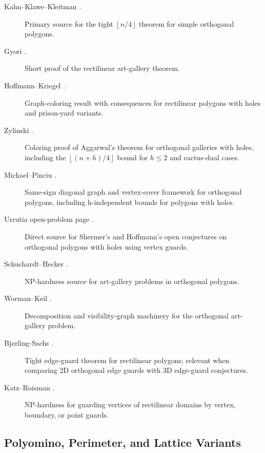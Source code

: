\documentclass[11pt]{article}
\newcommand{\floor}[1]{\left\lfloor #1 \right\rfloor}
\begin{document}
\begin{description}
  \item[Kahn--Klawe--Kleitman \cite{KahnKlaweKleitman1983}.]
  Primary source for the tight $\floor{n/4}$ theorem for simple orthogonal
  polygons.

  \item[Gyori \cite{Gyori1986}.]
  Short proof of the rectilinear art-gallery theorem.

  \item[Hoffmann--Kriegel \cite{HoffmannKriegel1996}.]
  Graph-coloring result with consequences for rectilinear polygons with holes
  and prison-yard variants.

  \item[Zylinski \cite{Zylinski2006}.]
  Coloring proof of Aggarwal's theorem for orthogonal galleries with holes,
  including the $\floor{(n+h)/4}$ bound for $h\leq 2$ and cactus-dual cases.

  \item[Michael--Pinciu \cite{MichaelPinciu2016}.]
  Same-sign diagonal graph and vertex-cover framework for orthogonal polygons,
  including h-independent bounds for polygons with holes.

  \item[Urrutia open-problem page \cite{UrrutiaOpenProblems}.]
  Direct source for Shermer's and Hoffmann's open conjectures on orthogonal
  polygons with holes using vertex guards.

  \item[Schuchardt--Hecker \cite{SchuchardtHecker1995}.]
  NP-hardness source for art-gallery problems in orthogonal polygons.

  \item[Worman--Keil \cite{WormanKeil2007}.]
  Decomposition and visibility-graph machinery for the orthogonal art-gallery
  problem.

  \item[Bj{\o}rling-Sachs \cite{BjorlingSachs1998}.]
  Tight edge-guard theorem for rectilinear polygons; relevant when comparing
  2D orthogonal edge guards with 3D edge-guard conjectures.

  \item[Katz--Roisman \cite{KatzRoisman2008}.]
  NP-hardness for guarding vertices of rectilinear domains by vertex, boundary,
  or point guards.
\end{description}

\subsection*{Polyomino, Perimeter, and Lattice Variants}
\end{document}
